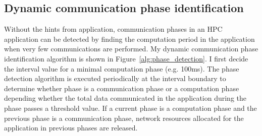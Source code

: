 \begin{comment}
Communications in different phases do not happen at the same time. As such, network
resources (such as communication channels) can be allocated
independently in different phases.
Hence, accurately identifying communication phases can improve
the SDN support for HPC applications. Traditionally SDN schemes such
as the Hedera's threshold-based scheme automatically detect communication
changes when the flow statistics are collected and processed. However,
the granularity of such detection is the same as that for flow statistics
collection and processing, and network reconfiguration,
which is in the order in seconds. Such a coarse granularity is ineffective
for tightly coupled HPC applications whose phases can change in
subseconds or even submilliseconds. 
\end{comment}


\subsection{Dynamic communication phase identification}

\begin{comment}
 Flow information used to
classify elephant flows in current phase should ignore the flow information for the flows in the
previous phase as these two set of flows  don't occur together.
In order to
determine if the network is in a communication phase, the network must be
probed at intervals smaller than the polling interval to check if data is being
sent above a certain threshold. If it is, then the network is in a
communication phase; otherwise, it is mostly in a computation phase.
If the
network transitions from a computation phase to a communication phase or vice versa during
probing, previous flow paths for elephant flows are disregarded, and the flow
informations for each flow in the current phase is considered for
prediction. 
\end{comment}

Without the hints from application, communication phases in an HPC
application can be detected by finding the computation period in the
application when very few communications are performed. 
My dynamic communication phase identification algorithm
is shown in Figure~\ref{alg:phase_detection}. I first decide the interval
value for a minimal computation phase (e.g. 100ms). The phase detection
algorithm is executed periodically at the interval boundary to determine
whether phase is a communication phase or a computation phase depending
whether the total data communicated in the application during the phase
passes a threshold value. If a current phase is a computation phase and
the previous phase is a communication phase, network resources allocated
for the application in previous phases are released. 


